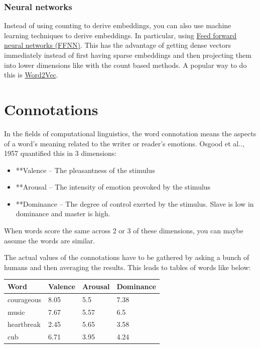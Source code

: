 \documentclass[
  11pt,
  british,
]{article}
\providecommand{\tightlist}{%
  \setlength{\itemsep}{0pt}\setlength{\parskip}{0pt}}
\begin{document}
\hypertarget{neural-networks}{%
\subsubsection{Neural networks}\label{neural-networks}}

Instead of using counting to derive embeddings, you can also use machine
learning techniques to derive embeddings. In particular, using
\href{../Prediction/Feed\%20forward\%20neural\%20networks\%20(FFNN).md}{Feed
forward neural networks (FFNN)}. This has the advantage of getting dense
vectors immediately instead of first having sparse embeddings and then
projecting them into lower dimensions like with the count based methods.
A popular way to do this is \href{Word2Vec.md}{Word2Vec}.

\hypertarget{connotations-1}{%
\section{Connotations}\label{connotations-1}}

In the fields of computational linguistics, the word connotation means
the aspects of a word's meaning related to the writer or reader's
emotions. Osgood et al.., 1957 quantified this in 3 dimensions:

\begin{itemize}
\tightlist
\item
  **Valence -- The pleasantness of the stimulus
\item
  **Arousal -- The intensity of emotion provoked by the stimulus
\item
  **Dominance -- The degree of control exerted by the stimulus. Slave is
  low in dominance and master is high.
\end{itemize}

When words score the same across 2 or 3 of these dimensions, you can
maybe assume the words are similar.

The actual values of the connotations have to be gathered by asking a
bunch of humans and then averaging the results. This leads to tables of
words like below:

\begin{longtable}[]{@{}llll@{}}
\toprule
\textbf{Word} & \textbf{Valence} & \textbf{Arousal} &
\textbf{Dominance} \\
\midrule
\endhead
courageous & 8.05 & 5.5 & 7.38 \\
music & 7.67 & 5.57 & 6.5 \\
heartbreak & 2.45 & 5.65 & 3.58 \\
cub & 6.71 & 3.95 & 4.24 \\
\bottomrule
\end{longtable}
\end{document}
